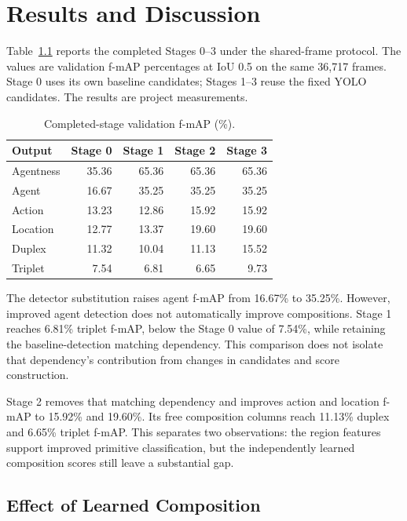 \chapter{Results and Discussion}

Table~\ref{tab:3} reports the completed Stages 0--3 under the shared-frame protocol. The values are validation f-mAP percentages at IoU 0.5 on the same 36,717 frames. Stage 0 uses its own baseline candidates; Stages 1--3 reuse the fixed YOLO candidates. The results are project measurements.

\begin{table}[htbp]
\centering
\caption{Completed-stage validation f-mAP (\%).}
\label{tab:3}
\begin{singlespace}
\begin{tabular}{@{}lrrrr@{}}
\toprule
\textbf{Output} & \textbf{Stage 0} & \textbf{Stage 1} & \textbf{Stage 2} & \textbf{Stage 3} \\
\midrule
Agentness & 35.36 & 65.36 & 65.36 & 65.36 \\
Agent & 16.67 & 35.25 & 35.25 & 35.25 \\
Action & 13.23 & 12.86 & 15.92 & 15.92 \\
Location & 12.77 & 13.37 & 19.60 & 19.60 \\
Duplex & 11.32 & 10.04 & 11.13 & 15.52 \\
Triplet & 7.54 & 6.81 & 6.65 & 9.73 \\
\bottomrule
\end{tabular}
\end{singlespace}
\end{table}

The detector substitution raises agent f-mAP from 16.67\% to 35.25\%. However, improved agent detection does not automatically improve compositions. Stage 1 reaches 6.81\% triplet f-mAP, below the Stage 0 value of 7.54\%, while retaining the baseline-detection matching dependency. This comparison does not isolate that dependency’s contribution from changes in candidates and score construction.

Stage 2 removes that matching dependency and improves action and location f-mAP to 15.92\% and 19.60\%. Its free composition columns reach 11.13\% duplex and 6.65\% triplet f-mAP. This separates two observations: the region features support improved primitive classification, but the independently learned composition scores still leave a substantial gap.

\section{Effect of Learned Composition}

